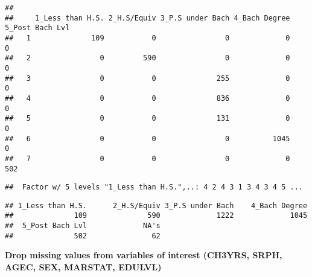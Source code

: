 \documentclass[
]{article}
\newenvironment{Shaded}{\begin{snugshade}}{\end{snugshade}}
\newcommand{\CommentTok}[1]{\textcolor[rgb]{0.56,0.35,0.01}{\textit{#1}}}
\newcommand{\ConstantTok}[1]{\textcolor[rgb]{0.56,0.35,0.01}{#1}}
\newcommand{\FunctionTok}[1]{\textcolor[rgb]{0.13,0.29,0.53}{\textbf{#1}}}
\newcommand{\NormalTok}[1]{#1}
\newcommand{\OtherTok}[1]{\textcolor[rgb]{0.56,0.35,0.01}{#1}}
\newcommand{\SpecialCharTok}[1]{\textcolor[rgb]{0.81,0.36,0.00}{\textbf{#1}}}
\begin{document}
\begin{verbatim}
##    
##     1_Less than H.S. 2_H.S/Equiv 3_P.S under Bach 4_Bach Degree 5_Post Bach Lvl
##   1              109           0                0             0               0
##   2                0         590                0             0               0
##   3                0           0              255             0               0
##   4                0           0              836             0               0
##   5                0           0              131             0               0
##   6                0           0                0          1045               0
##   7                0           0                0             0             502
\end{verbatim}

\begin{Shaded}
\end{Shaded}

\begin{verbatim}
##  Factor w/ 5 levels "1_Less than H.S.",..: 4 2 4 3 1 3 4 3 4 5 ...
\end{verbatim}

\begin{Shaded}
\end{Shaded}

\begin{verbatim}
## 1_Less than H.S.      2_H.S/Equiv 3_P.S under Bach    4_Bach Degree 
##              109              590             1222             1045 
##  5_Post Bach Lvl             NA's 
##              502               62
\end{verbatim}

\begin{Shaded}
\end{Shaded}

\textbf{Drop missing values from variables of interest (CH3YRS, SRPH,
AGEC, SEX, MARSTAT, EDULVL)}
\end{document}

